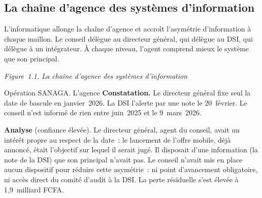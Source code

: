 \subsection{La chaîne d'agence des systèmes d'information}

L'informatique allonge la chaîne d'agence et accroît l'asymétrie
d'information à chaque maillon. Le conseil délègue au directeur général,
qui délègue au DSI, qui délègue à un intégrateur. À chaque niveau, l'agent
comprend mieux le système que son principal.

\begin{center}
\end{center}
\vspace{-0.4em}
\begin{center}{\small\itshape Figure~1.1. La chaîne d'agence des systèmes
d'information}\end{center}

\begin{boxscenario}{Opération SANAGA. L'agence}
\textbf{Constatation.} Le directeur général fixe seul la date de bascule
en janvier~2026. La DSI l'alerte par une note le 20~février. Le conseil
n'est informé de rien entre juin~2025 et le 9~mars~2026.

\medskip
\textbf{Analyse} (confiance élevée). Le directeur général, agent du
conseil, avait un intérêt propre au respect de la date~: le lancement
de l'offre mobile, déjà annoncé, était l'objectif sur lequel il serait
jugé. Il disposait d'une information (la note de la DSI) que son principal
n'avait pas. Le conseil n'avait mis en place aucun dispositif pour réduire
cette asymétrie~: ni point d'avancement obligatoire, ni accès direct du
comité d'audit à la DSI. La perte résiduelle s'est élevée à
1,9~milliard FCFA.
\end{boxscenario}

